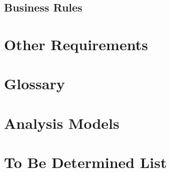 \documentclass[english]{article}
\numberwithin{equation}{section} %
\begin{document}
\subsection{Business Rules}

\newpage
\section{Other Requirements}
\appendix
\section{Glossary}
\section{Analysis Models}
\section{To Be Determined List}
\end{document}
